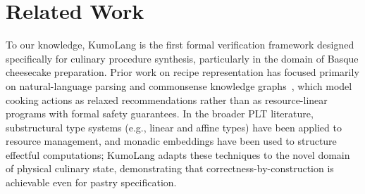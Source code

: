 \documentclass[11pt, a4paper]{article}
\begin{document}
\section{Related Work}
To our knowledge, KumoLang is the first formal verification framework designed specifically for culinary procedure synthesis, particularly in the domain of Basque cheesecake preparation. Prior work on recipe representation has focused primarily on natural-language parsing and commonsense knowledge graphs~\cite{commonsense}, which model cooking actions as relaxed recommendations rather than as resource-linear programs with formal safety guarantees. In the broader PLT literature, substructural type systems (e.g., linear and affine types) have been applied to resource management, and monadic embeddings have been used to structure effectful computations; KumoLang adapts these techniques to the novel domain of physical culinary state, demonstrating that correctness-by-construction is achievable even for pastry specification.

\appendix
\end{document}
